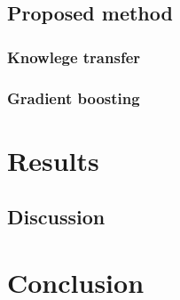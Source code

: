\documentclass{article}
\begin{document}
\subsection{Proposed method}

\subsubsection{Knowlege transfer}

\subsubsection{Gradient boosting}

\section{Results}

\subsection{Discussion}

\section{Conclusion}

\footnotesize{
\begin{spacing}{.85 }


\end{spacing}
}
\end{document}
